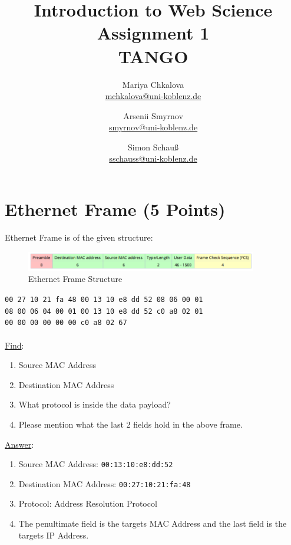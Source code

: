 \documentclass[12pt]{article}
\title{
	\Huge{Introduction to Web Science} \\
	\vspace{1em}
	\LARGE{Assignment 1} \\
	\vspace{1em}
	\Large{TANGO}
}
\author {
	Mariya Chkalova \\{\normalsize\href{mailto:mchkalova@uni-koblenz.de}{mchkalova@uni-koblenz.de}} \and
	Arsenii Smyrnov \\{\normalsize\href{mailto:smyrnov@uni-koblenz.de}{smyrnov@uni-koblenz.de}} \and
	Simon Schau\ss \\{\normalsize\href{mailto:sschauss@uni-koblenz.de}{sschauss@uni-koblenz.de}}
}
\date{}
\begin{document}
\maketitle
{}
\newpage


\section{Ethernet Frame (5 Points)}

Ethernet Frame is of the given structure:

\begin{figure}[h]
	\centering
	\includegraphics[width=0.9\textwidth]{ethernet.png}
	\caption{Ethernet Frame Structure}
	\label{fig:ethernet}
\end{figure}

\texttt{00 27 10 21 fa 48 00 13 \hspace{0.5cm} 10 e8 dd 52 08 06 00 01\\ 08 00 06 04 00 01 00 13 \hspace{0.5cm} 10 e8 dd 52 c0 a8 02 01\\ 00 00 00 00 00 00 c0 a8 \hspace{0.5cm} 02 67} \\ \\

\underline{Find}:
\begin{enumerate}
	\item Source MAC Address
	\item Destination MAC Address
	\item What protocol is inside the data payload?
	\item Please mention what the last 2 fields hold in the above frame.
\end{enumerate}

\underline{Answer}:

\begin{enumerate}
	\item Source MAC Address: \texttt{00:13:10:e8:dd:52}
	\item Destination MAC Address: \texttt{00:27:10:21:fa:48}
	\item Protocol: Address Resolution Protocol 
	\item The penultimate field is the targets MAC Address and the last field is the targets IP Address.
\end{enumerate}
\end{document}
